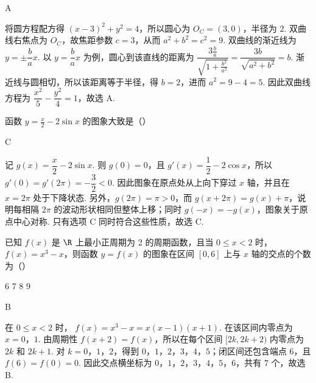 \begin{answer}
A
\end{answer}

\begin{solution}
将圆方程配方得 \((x-3)^2+y^2=4\)，所以圆心为 \(O_C=(3,0)\)，半径为 \(2\). 双曲线右焦点为 \(O_C\)，故焦距参数 \(c=3\)，从而
\(a^2+b^2=c^2=9\).
双曲线的渐近线为 \(y=\pm\dfrac ba x\). 以 \(y=\dfrac ba x\) 为例，圆心到该直线的距离为
\(\dfrac{3\frac{b}{a}}{\sqrt{1+\frac{b^2}{a^2}}}=\dfrac{3b}{\sqrt{a^2+b^2}}=b\).
渐近线与圆相切，所以该距离等于半径，得 \(b=2\)，进而 \(a^2=9-4=5\). 因此双曲线方程为 \(\dfrac{x^2}{5}-\dfrac{y^2}{4}=1\)，故选 A.
\end{solution}

\begin{problem}
函数 \( y = \frac{x}{2} - 2\sin x \) 的图象大致是（\quad）

    {}
    {}
    {}
\end{problem}

\begin{answer}
C
\end{answer}

\begin{solution}
记 \(g(x)=\dfrac{x}{2}-2\sin x\). 则
\(g(0)=0\)，且 \(g'(x)=\dfrac12-2\cos x\)，所以 \(g'(0)=g'(2\pi)=-\dfrac32<0\). 因此图象在原点处从上向下穿过 \(x\) 轴，并且在 \(x=2\pi\) 处于下降状态.
另外，\(g(2\pi)=\pi>0\)，而 \(g(x+2\pi)=g(x)+\pi\)，说明每相隔 \(2\pi\) 的波动形状相同但整体上移；同时 \(g(-x)=-g(x)\)，图象关于原点中心对称. 只有选项 C 同时符合这些性质，故选 C.
\end{solution}

\begin{problem}
已知 \( f(x) \) 是 \( \R \) 上最小正周期为 2 的周期函数，且当 \( 0 \leqslant x < 2 \) 时，\( f(x) = x^3 - x \)，则函数 \( y = f(x) \) 的图象在区间 \([0, 6]\) 上与 \( x \) 轴的交点的个数为（\quad）

\choices
    {6}
    {7}
    {8}
    {9}
\end{problem}

\begin{answer}
B
\end{answer}

\begin{solution}
在 \(0\leqslant x<2\) 时，
\(f(x)=x^3-x=x(x-1)(x+1)\). 在该区间内零点为 \(x=0\)，\(1\).
由周期性 \(f(x+2)=f(x)\)，所以在每个区间 \([2k,2k+2)\) 内零点为 \(2k\) 和 \(2k+1\). 对 \(k=0\)，\(1\)，\(2\)，得到 \(0\)，\(1\)，\(2\)，\(3\)，\(4\)，\(5\)；闭区间还包含端点 \(6\)，且 \(f(6)=f(0)=0\). 因此交点横坐标为 \(0\)，\(1\)，\(2\)，\(3\)，\(4\)，\(5\)，\(6\)，共有 \(7\) 个，故选 B.
\end{solution}

